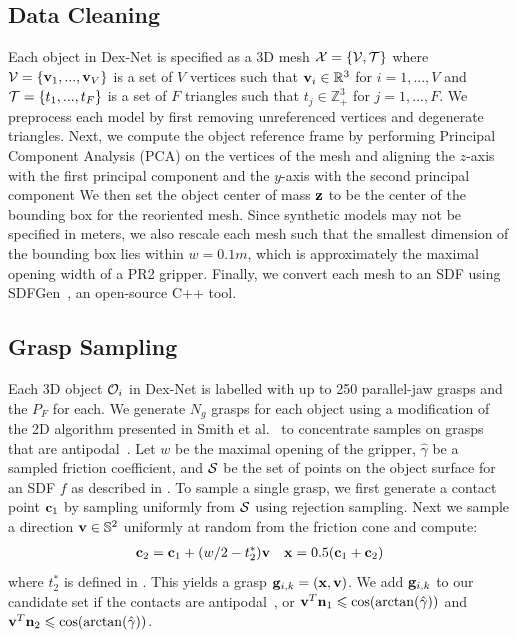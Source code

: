 

\subsection{Data Cleaning}
Each object in Dex-Net is specified as a 3D mesh $\mathcal{X} = \{\mathcal{V}, \mathcal{T}\}$ where $\mathcal{V} = \{\mathbf{v}_1, ..., \mathbf{v}_V\}$ is a set of $V$ vertices such that $\mathbf{v}_i \in \mathbb{R}^3$ for $i = 1, ..., V$ and $\mathcal{T} = \{t_1, ..., t_F\}$  is a set of $F$ triangles such that $t_j \in \mathbb{Z}_{+}^3$ for $j = 1, ..., F$.
We preprocess each model by first removing unreferenced vertices and degenerate triangles.
Next, we compute the object reference frame by performing Principal Component Analysis (PCA) on the vertices of the mesh and aligning the $z$-axis with the first principal component and the $y$-axis with the second principal component
We then set the object center of mass $\mathbf{z}$ to be the center of the bounding box for the reoriented mesh.
Since synthetic models may not be specified in meters, we also rescale each mesh such that the smallest dimension of the bounding box lies within $w = 0.1m$, which is approximately the maximal opening width of a PR2 gripper.
Finally, we convert each mesh to an SDF using SDFGen~\cite{sdfgen}, an open-source C++ tool.

\subsection{Grasp Sampling}
Each 3D object $\mathcal{O}_i$ in Dex-Net is labelled with up to 250 parallel-jaw grasps and the $P_F$ for each.
We generate $N_g$ grasps for each object using a modification of the 2D algorithm presented in Smith et al.~\cite{smith1999computing} to concentrate samples on grasps that are antipodal~\cite{mahler2015gp}.
Let $w$ be the maximal opening of the gripper, $\hat{\gamma}$ be a sampled friction coefficient, and $\mathcal{S}$ be the set of points on the object surface for an SDF $f$ as described in .
To sample a single grasp, we first generate a contact point $\mathbf{c}_1$ by sampling uniformly from $\mathcal{S}$ using rejection sampling.
Next we sample a direction $\mathbf{v} \in \mathbb{S}^2$ uniformly at random from the friction cone and compute:
\begin{align*}
	\mathbf{c}_2 = \mathbf{c}_1 + (w / 2 - t_2^*) \mathbf{v}  &&  \mathbf{x} = 0.5 (\mathbf{c}_1 + \mathbf{c}_2)
\end{align*}
\noindent where $t_2^*$ is defined in .
This yields a grasp $\mathbf{g}_{i,k} = (\mathbf{x}, \mathbf{v})$.
We add $\mathbf{g}_{i,k}$ to our candidate set if the contacts are antipodal~\cite{mahler2015gp}, or $\mathbf{v}^T \mathbf{n}_1 \leqslant \cos(\arctan(\hat{\gamma}))$ and $\mathbf{v}^T \mathbf{n}_2 \leqslant \cos(\arctan(\hat{\gamma}))$.

